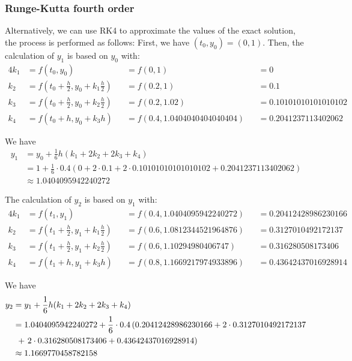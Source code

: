 \documentclass[a4paper]{article}
\numberwithin{equation}{section}
\begin{document}
\subsubsection{Runge-Kutta fourth order}
Alternatively, we can use RK4 to approximate the values of the exact solution, the process is performed as follows:
First, we have \((t_0, y_0) = (0, 1)\). Then, the calculation of \(y_1\) is based on \(y_0\) with:
\begin{alignat*}{4}
  k_1 & = f(t_0, y_0)                                            &  & = f(0, 1)                    &  & = 0                   \\
  k_2 & = f \left(t_0 + \frac{h}{2}, y_0 + k_1\frac{h}{2}\right) &  & = f(0.2, 1)                  &  & = 0.1                 \\
  k_3 & = f \left(t_0 + \frac{h}{2}, y_0 + k_2\frac{h}{2}\right) &  & = f(0.2, 1.02)               &  & = 0.10101010101010102 \\
  k_4 & = f(t_0 + h, y_0 + k_3h)                                 &  & = f(0.4, 1.0404040404040404) &  & = 0.2041237113402062
\end{alignat*}

We have
\begin{align*}
  y_1 & = y_0 + \frac{1}{6}h(k_1 + 2k_2 + 2k_3 + k_4)                                                              \\
      & = 1 + \frac{1}{6} \cdot 0.4\left(0 + 2 \cdot 0.1 + 2 \cdot 0.10101010101010102 + 0.2041237113402062\right) \\
      & \approx 1.0404095942240272
\end{align*}

The calculation of \(y_2\) is based on \(y_1\) with:
\begin{alignat*}{4}
  k_1 & = f(t_1, y_1)                                            &  & = f(0.4, 1.0404095942240272) &  & = 0.20412428986230166 \\
  k_2 & = f \left(t_1 + \frac{h}{2}, y_1 + k_1\frac{h}{2}\right) &  & = f(0.6, 1.0812344521964876) &  & = 0.3127010492172137  \\
  k_3 & = f \left(t_1 + \frac{h}{2}, y_1 + k_2\frac{h}{2}\right) &  & = f(0.6, 1.10294980406747)   &  & = 0.316280508173406   \\
  k_4 & = f(t_1 + h, y_1 + k_3h)                                 &  & = f(0.8, 1.1669217974933896) &  & = 0.43642437016928914
\end{alignat*}

We have
\begin{align*}
  y_2 & = y_1 + \frac{1}{6}h(k_1 + 2k_2 + 2k_3 + k_4)                                                             \\
      & = 1.0404095942240272 + \frac{1}{6} \cdot 0.4\left(0.20412428986230166 + 2 \cdot 0.3127010492172137\right. \\
      & \ \left.+\ 2 \cdot 0.316280508173406 + 0.43642437016928914\vphantom{1}\right)                             \\
      & \approx 1.1669770458782158
\end{align*}
\end{document}
